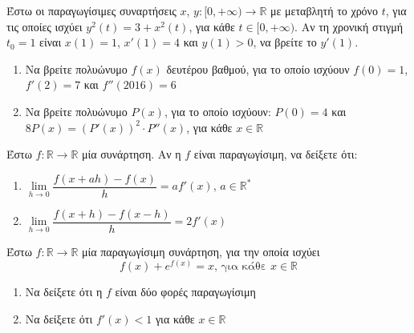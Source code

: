 \documentclass{presentation}
\begin{document}
\begin{askisi}
    Έστω οι παραγωγίσιμες συναρτήσεις $x$, $y:[0,+\infty)\to\mathbb{R}$ με μεταβλητή το χρόνο $t$, για τις οποίες ισχύει $y^2(t)=3+x^2(t)$, για κάθε $t\in [0,+\infty )$. Αν τη χρονική στιγμή $t_0=1$ είναι $x(1)=1$, $x'(1)=4$ και $y(1)>0$, να βρείτε το $y'(1)$.

\end{askisi}

\begin{askisi}
    \begin{enumerate}
        \item<1->  Να βρείτε πολυώνυμο $f(x)$ δευτέρου βαθμού, για το οποίο ισχύουν $f(0)=1$, $f'(2)=7$ και $f''(2016)=6$
        \item<2-> Να βρείτε πολυώνυμο $P(x)$, για το οποίο ισχύουν: $P(0)=4$ και $8P(x)=\left( P'(x)\right)^2\cdot P''(x)  $, για κάθε $x\in\mathbb{R}$
    \end{enumerate}

\end{askisi}

\begin{askisi}
    Έστω $f:\mathbb{R}\to\mathbb{R}$ μία συνάρτηση. Αν η $f$ είναι παραγωγίσιμη, να δείξετε ότι:
    \begin{enumerate}
        \item<1-> $\lim\limits_{h \to 0}{ \dfrac{f(x+ah)-f(x)}{h} }=af'(x)$, $a\in\mathbb{R}^*$
        \item<2-> $\lim\limits_{h \to 0}{ \dfrac{f(x+h)-f(x-h)}{h} }=2f'(x)$
    \end{enumerate}

\end{askisi}

\begin{askisi}
    Έστω $f:\mathbb{R}\to\mathbb{R}$ μία παραγωγίσιμη συνάρτηση, για την οποία ισχύει
    $$f(x)+e^{f(x)}=x \text{, για κάθε } x\in\mathbb{R}$$
    \begin{enumerate}
        \item<1-> Να δείξετε ότι η $f$ είναι δύο φορές παραγωγίσιμη
        \item<2-> Να δείξετε ότι $f'(x)<1$ για κάθε $x\in\mathbb{R}$
    \end{enumerate}

\end{askisi}
\end{document}
